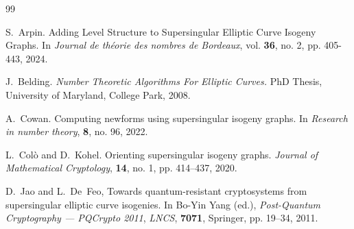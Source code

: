 \documentclass{amsart}
\begin{document}
\begin{thebibliography}{99}
  
S.~Arpin.
Adding Level Structure to Supersingular Elliptic Curve Isogeny Graphs.
In {\it  Journal de théorie des nombres de Bordeaux}, vol. {\bf 36}, no. 2, pp. 405-443, 2024.
  
 J.~Belding.
 {\it Number Theoretic Algorithms For Elliptic Curves.}
  PhD Thesis, University of Maryland, College Park, 2008.

  A.~Cowan.
  Computing newforms using supersingular isogeny graphs.
  In {\it Research in number theory}, {\bf 8}, no. 96, 2022.

%
%

  L.~Col\`o and D.~Kohel.
  Orienting supersingular isogeny graphs.
  {\it Journal of Mathematical Cryptology},
  {\bf 14}, no. 1, pp. 414--437, 2020.


  D.~Jao and L.~De~Feo,
  Towards quantum-resistant cryptosystems from supersingular elliptic curve isogenies.
  In Bo-Yin Yang (ed.), {\it Post-Quantum Cryptography --- PQCrypto 2011},
  {\it LNCS}, {\bf 7071}, Springer, pp. 19--34, 2011.

\end{thebibliography}
\end{document}
